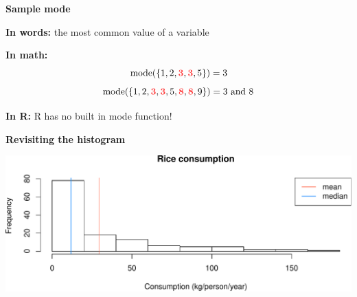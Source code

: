 \documentclass[ignorenonframetext,]{beamer}
\newenvironment{Shaded}{\begin{snugshade}}{\end{snugshade}}
\newcommand{\DataTypeTok}[1]{\textcolor[rgb]{0.13,0.29,0.53}{#1}}
\newcommand{\DecValTok}[1]{\textcolor[rgb]{0.00,0.00,0.81}{#1}}
\newcommand{\KeywordTok}[1]{\textcolor[rgb]{0.13,0.29,0.53}{\textbf{#1}}}
\newcommand{\NormalTok}[1]{#1}
\newcommand{\OperatorTok}[1]{\textcolor[rgb]{0.81,0.36,0.00}{\textbf{#1}}}
\newcommand{\StringTok}[1]{\textcolor[rgb]{0.31,0.60,0.02}{#1}}
\begin{document}
\begin{frame}{}
\protect\hypertarget{section-32}{}

\textbf{\large Sample mode}

\vspace{2ex}

\textbf{In words:} the most common value of a variable

\vspace{2ex}

\textbf{In math:}
\[\textrm{mode}(\{1, 2, \mathbf{\color{coralred}3},\mathbf{\color{coralred}3}, 5\})= 3\]
\[\textrm{mode}(\{1, 2, \mathbf{\color{coralred}3},\mathbf{\color{coralred}3}, 5, \mathbf{\color{coralred}8}, \mathbf{\color{coralred}8},9\})= 3\text{ and } 8\]

\vspace{2ex}

\textbf{In R:} R has no built in mode function!

\end{frame}

\begin{frame}[fragile]{}
\protect\hypertarget{section-33}{}

\textbf{\large Revisiting the histogram}

\vspace{1ex}\scriptsize

\begin{Shaded}
\end{Shaded}

\includegraphics{lecture-03_files/figure-beamer/unnamed-chunk-19-1.pdf}

\end{frame}
\end{document}

